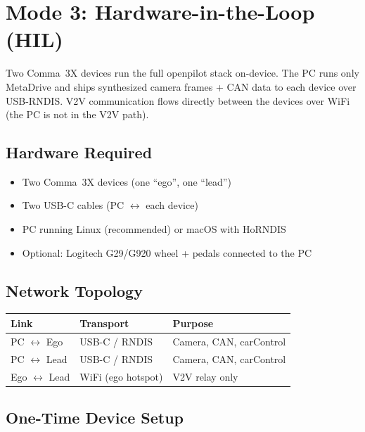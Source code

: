 \documentclass[11pt, letterpaper]{article}
\begin{document}
\section{Mode 3: Hardware-in-the-Loop (HIL)}
\label{sec:mode3}

Two Comma~3X devices run the full openpilot stack on-device.  The PC
runs only MetaDrive and ships synthesized camera frames + CAN data to
each device over USB-RNDIS.  V2V communication flows directly between
the devices over WiFi (the PC is not in the V2V path).

\subsection{Hardware Required}

\begin{itemize}
  \item Two Comma~3X devices (one ``ego'', one ``lead'')
  \item Two USB-C cables (PC $\leftrightarrow$ each device)
  \item PC running Linux (recommended) or macOS with HoRNDIS
  \item Optional: Logitech G29/G920 wheel + pedals connected to the PC
\end{itemize}

\subsection{Network Topology}

\begin{center}
\begin{tabular}{@{}lll@{}}
\toprule
\textbf{Link} & \textbf{Transport} & \textbf{Purpose} \\
\midrule
PC $\leftrightarrow$ Ego   & USB-C / RNDIS & Camera, CAN, carControl \\
PC $\leftrightarrow$ Lead  & USB-C / RNDIS & Camera, CAN, carControl \\
Ego $\leftrightarrow$ Lead & WiFi (ego hotspot) & V2V relay only \\
\bottomrule
\end{tabular}
\end{center}

\subsection{One-Time Device Setup}
\label{sec:mode3-onetime}
\end{document}
